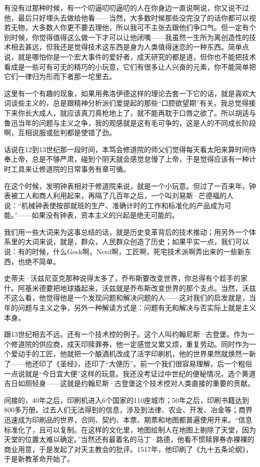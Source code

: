 有没有过那种时候，有一个叨逼叨叨逼叨的人在你身边一直说啊说，你又说不过他，最后只好埋头去做给他看------当然，大多数时候那些没完没了的话你都可以视若无物，大多数人你更不要去理他，所以我可不主张去跟他们争口气。但一定有个别时候，你觉得值得这么做一下才可以让他闭嘴------我虽然一生所为离创造性的技术相去甚远，但我还是觉得技术这东西是身为人类值得迷恋的一种东西。简单点说，就是哪怕你是一个宏大事件的爱好者，成天研究的都是道，但你也不能把技术看成是一些可有可无的精巧的小玩意，它们有很多让人兴奋的元素，你不能简单把它们一律归为形而下者那一坨里去。

这里有一个有趣的现象，如果用弗洛伊德这样的理论去套一下它的话，就是喜欢大词谈些主义的，总是跟精神分析派们爱提起的那些``口腔欲望期''有关。我总觉得接下来你长大成人，就应该真刀真枪地上了，就不能再耽于口唇之欲了。所以胡适与鲁迅当年的问题与主义之争，我的观感就是这有毛可争的，这是人的不同成长阶段啊，互相说服或批判都是使错了劲。

话说在12到13世纪那一段时间，本笃会修道院的师父们觉得每天看太阳来算时间侍奉上帝，总是不够严肃，碰到个阴天就会感觉怠慢了上帝，于是觉得应该有一种计时工具来让修道院的日常事务有章可循。

在这个时候，发明钟表相对于修道院来说，就是一个小玩意。但过了一百来年，钟表被工人和商人利用起来，再隔了几百年之后，一个叫刘易斯·芒德福的人说：``机械钟表使按部就班的生产、准确计时的工作和标准化的产品成为可能。''------如果没有钟表，资本主义的兴起是绝无可能的。

我们用一些大词来为这事总结的话，就是历史变革背后的技术推动；用另外一个体系里的大词来说，就是，群众，人民群众创造了历史；如果平实一点，我们可以说：有的时候，什么Geek啊，Nerd啊，工匠啊，死宅技术派啊弄出来的一些新东西，也绝不简单。

史蒂夫·沃兹尼亚克那种说得太多了，乔布斯要改变世界，你总得有个趁手的家什。阿基米德要把地球撬起来，沃兹就是乔布斯改变世界的那个支点。当然，沃兹不这么看，他觉得他是一个发现问题和解决问题的人------这对我们的启发就是，当年的问题与主义之争，另外一种解读方式是：问题有无和解决与否实际上就是主义本身。

跟13世纪相去不远，还有一个技术控的例子。这个人叫约翰尼斯·古登堡。作为一个修道院的供应商，成天印赎罪券，他一定感觉又累又烦，重复劳动。同时作为一个爱动手的工匠，他就把一个酿酒机改成了活字印刷机，他的世界果然就焕然一新了------他还印了《圣经》，还印了``大便历''。前一个我们很容易理解，后一个粗俗一点说就是``今日宜大便''这样的玩意。我还没考证过中世纪的便秘情况，选个黄道吉日如厕轻身------这就是约翰尼斯·古登堡这个技术控对人类直接的重要的贡献。

间接的，40年之后，印刷机进入6个国家的110座城市；50年之后，印刷书籍达到800多万册。过去人们无法得到的信息，涉及到法律、农业、开发、冶金等；商界迅速成为印刷品的世界，合同、契约、本票、期票和地图都普遍使用开来。``信息标准化了，且可以复制。在这样的文化里，地图绘制人在地图上剔除了天堂，因为天堂的位置太难以确定。''当然还有最着名的马丁·路德，他看不惯赎罪券赤裸裸的商业用意，于是发起了对天主教会的批评。1517年，他印刷了《九十五条论纲》，于是新教革命开始了。

